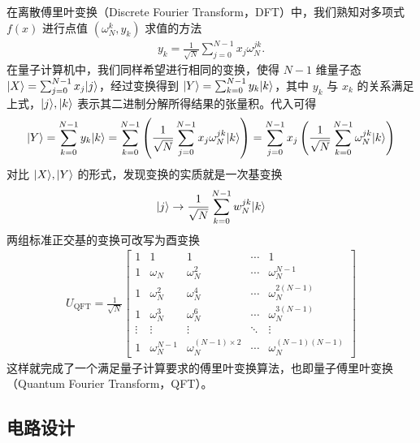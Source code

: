 在离散傅里叶变换（Discrete Fourier Transform，DFT）中，我们熟知对多项式 $f(x)$ 进行点值 $(\omega_N^k,y_k)$ 求值的方法 \begin{align}
    y_k=\frac{1}{\sqrt{N}}\sum_{j=0}^{N-1}x_j\omega_N^{jk}.
\end{align}
在量子计算机中，我们同样希望进行相同的变换，使得 $N-1$ 维量子态 $|X\rangle=\sum_{j=0}^{N-1}x_j|j\rangle$，经过变换得到 $|Y\rangle=\sum_{k=0}^{N-1}y_k|k\rangle$，其中 $y_k$ 与 $x_k$ 的关系满足上式，$|j\rangle,|k\rangle$ 表示其二进制分解所得结果的张量积。代入可得 \begin{align}
    |Y\rangle=\sum_{k=0}^{N-1}y_k|k\rangle=\sum_{k=0}^{N-1}\left(\frac{1}{\sqrt{N}}\sum_{j=0}^{N-1}x_j\omega_N^{jk}|k\rangle\right)=\sum_{j=0}^{N-1}x_j\left(\frac{1}{\sqrt{N}}\sum_{k=0}^{N-1}\omega_N^{jk}|k\rangle\right)
\end{align}
对比 $|X\rangle,|Y\rangle$ 的形式，发现变换的实质就是一次基变换 \begin{align}
        |j\rangle\to\frac{1}{\sqrt{N}}\sum_{k=0}^{N-1}w_N^{jk}|k\rangle\label{eq:qft-change-basis}
    \end{align}
两组标准正交基的变换可改写为酉变换 \begin{align}
    U_{\text{QFT}} = \frac{1}{\sqrt{N}}
    \begin{bmatrix}
        1      & 1               & 1                         & \cdots & 1                      \\
        1      & \omega_N        & \omega_N ^{2}             & \cdots & \omega_N ^{N-1}        \\
        1      & \omega_N ^{2}   & \omega_N ^{4}             & \cdots & \omega_N ^{2(N-1)}     \\
        1      & \omega_N ^{3}   & \omega_N ^{6}             & \cdots & \omega_N ^{3(N-1)}     \\
        \vdots & \vdots          & \vdots                    & \ddots & \vdots                 \\
        1      & \omega_N ^{N-1} & \omega_N ^{(N-1)\times 2} & \cdots & \omega_N ^{(N-1)(N-1)}
    \end{bmatrix}
\end{align}
这样就完成了一个满足量子计算要求的傅里叶变换算法，也即量子傅里叶变换（Quantum Fourier Transform，QFT）。

\subsection{电路设计}

